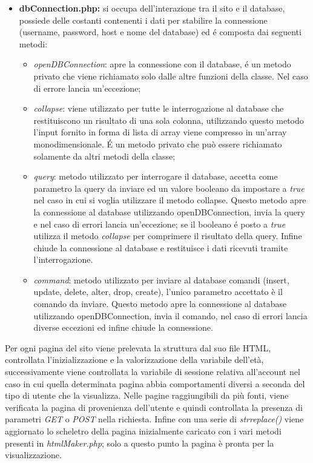 \begin{itemize}
\begin{itemize}
		\item \textit{makeAccessdenied}: costruisce una pagina di errore nel caso in cui l'utente non abbia i permessi di vedere una determinata pagina.
		\item \textit{userInfo}: metodo utilizzato da \textit{dettagli account}, costruisce una lista con tutte le informazioni dell'account in cui si é loggati.
	\end{itemize}
\item \textbf{dbConnection.php:} si occupa dell'interazione tra il sito e il database, possiede delle costanti contenenti i dati per stabilire la connessione (username, password, host e nome del database) ed é composta dai seguenti metodi:
	\begin{itemize}
		\item \textit{openDBConnection}: apre la connessione con il database, é un metodo privato che viene richiamato solo dalle altre funzioni della classe. Nel caso di errore lancia un'eccezione;
		\item \textit{collapse}: viene utilizzato per tutte le interrogazione al database che restituiscono un risultato di una sola colonna, utilizzando questo metodo l'input fornito in forma di lista di array viene compresso in un'array monodimensionale. \'E un metodo privato che può essere richiamato solamente da altri metodi della classe;
		\item \textit{query}: metodo utilizzato per interrogare il database, accetta come parametro la query da inviare ed un valore booleano da impostare a \textit{true} nel caso in cui si voglia utilizzare il metodo collapse. Questo metodo apre la connessione al database utilizzando openDBConnection, invia la query e nel caso di errori lancia un'eccezione; se il booleano é posto a \textit{true} utilizza il metodo \textit{collapse} per comprimere il risultato della query. Infine chiude la connessione al database e restituisce i dati ricevuti tramite l'interrogazione.
		\item \textit{command}: metodo utilizzato per inviare al database comandi (insert, update, delete, alter, drop, create), l'unico parametro accettato è il comando da inviare. Questo metodo apre la connessione al database utilizzando openDBConnection, invia il comando, nel caso di errori lancia diverse eccezioni ed infine chiude la connessione.
	\end{itemize}
\end{itemize}
Per ogni pagina del sito viene prelevata la struttura dal suo file HTML, controllata l'inizializzazione e la valorizzazione della variabile dell'età, successivamente viene controllata la variabile di sessione relativa all'account nel caso in cui quella determinata pagina abbia comportamenti diversi a seconda del tipo di utente che la visualizza. Nelle pagine raggiungibili da più fonti, viene verificata la pagina di provenienza dell'utente e quindi controllata la presenza di parametri \textit{GET} o \textit{POST} nella richiesta. Infine con una serie di \textit{str\textunderscore replace()} viene aggiornato lo scheletro della pagina inizialmente caricato con i vari metodi presenti in \textit{htmlMaker.php}; solo a questo punto la pagina è pronta per la visualizzazione.
